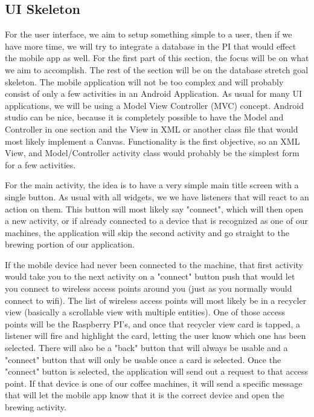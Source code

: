 \documentclass[conference]{IEEEtran}
\begin{document}
\subsection{UI Skeleton}
For the user interface, we aim to setup something simple to a user, then if we have more time, we will try to integrate a database in the PI that would effect the mobile app as well. For the first part of this section, the focus will be on what we aim to
accomplish. The rest of the section will be on the database stretch goal skeleton. The mobile application will not be too complex
and will probably consist of only a few activities in an Android Application. As usual for many UI applications, we will be using
a Model View Controller (MVC) concept.  Android studio can be nice, because it is completely possible to have the Model and
Controller in one section and the View in XML or another class file that would most likely implement a Canvas. Functionality is
the first objective, so an XML View, and Model/Controller activity class would probably be the simplest form for a few activities.
\par For the main activity, the idea is to have a very simple main title screen with a single button. As usual with all widgets, we
we have listeners that will react to an action on them. This button will most likely say "connect", which will then open a new
activity, or if already connected to a device that is recognized as one of our machines, the application will skip the second activity and go straight to the brewing portion of our application.
\par If the mobile device had never been connected to the machine, that first activity would take you to the next activity on a "connect" button push that would let you connect to wireless access points around you (just as you normally would connect to wifi). The list of wireless access points will most likely be in a recycler view (basically a scrollable view with multiple entities). One of those access points will be the Raspberry PI's, and once that recycler view card is tapped, a listener will fire and highlight the card, letting the user know which one has been selected. There will also be a "back" button that will always be usable and a "connect" button that will only be usable once a card is selected. Once the "connect" button is selected, the application will send out a request to that access point. If that device is one of our coffee machines, it will send a specific message that will let the mobile app know that it is the correct device and open the brewing activity.
\par %
\end{document}
